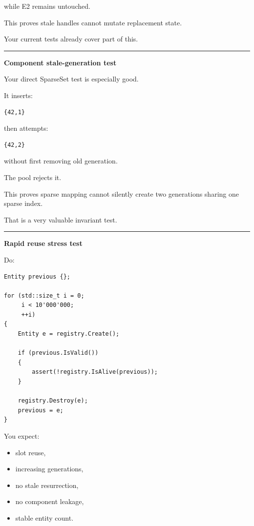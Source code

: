 while E2 remains untouched.

This proves stale handles cannot mutate replacement state.

Your current tests already cover part of this.

\begin{center}\rule{0.5\linewidth}{0.5pt}\end{center}

\textbf{Component stale-generation test}

Your direct SparseSet test is especially good.

It inserts:

\begin{verbatim}
{42,1}
\end{verbatim}

then attempts:

\begin{verbatim}
{42,2}
\end{verbatim}

without first removing old generation.

The pool rejects it.

This proves sparse mapping cannot silently create two generations sharing one sparse index.

That is a very valuable invariant test.

\begin{center}\rule{0.5\linewidth}{0.5pt}\end{center}

\textbf{Rapid reuse stress test}

Do:

\begin{verbatim}
Entity previous {};

for (std::size_t i = 0;
     i < 10'000'000;
     ++i)
{
    Entity e = registry.Create();

    if (previous.IsValid())
    {
        assert(!registry.IsAlive(previous));
    }

    registry.Destroy(e);
    previous = e;
}
\end{verbatim}

You expect:

\begin{itemize}
\tightlist
\item
  slot reuse,
\item
  increasing generations,
\item
  no stale resurrection,
\item
  no component leakage,
\item
  stable entity count.
\end{itemize}

